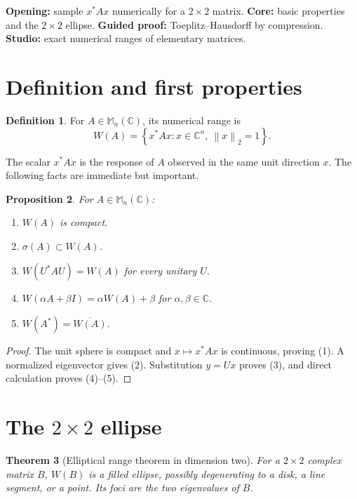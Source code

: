 \documentclass[11pt,oneside,openany]{book}
\newtheorem{theorem}{Theorem}[chapter]
\newtheorem{proposition}[theorem]{Proposition}
\theoremstyle{definition}
\newtheorem{definition}[theorem]{Definition}
\theoremstyle{remark}
\newcommand{\C}{\mathbb C}
\newcommand{\Mn}{\mathbb M_n(\C)}
\newcommand{\spec}{\sigma}
\newcommand{\norm}[1]{\left\lVert #1\right\rVert}
\newcommand{\set}[1]{\left\{#1\right\}}
\begin{document}
\begin{workshopplan}
\textbf{Opening:} sample \(x^*Ax\) numerically for a \(2\times2\)
matrix. \textbf{Core:} basic properties and the \(2\times2\) ellipse.
\textbf{Guided proof:} Toeplitz--Hausdorff by compression.
\textbf{Studio:} exact numerical ranges of elementary matrices.
\end{workshopplan}

\section{Definition and first properties}

\begin{definition}
For \(A\in\Mn\), its numerical range is
\[
  W(A)=\set{x^*Ax:x\in\C^n,\ \norm{x}_2=1}.
\]
\end{definition}

The scalar \(x^*Ax\) is the response of \(A\) observed in the same unit
direction \(x\).  The following facts are immediate but important.

\begin{proposition}
\label{prop:W-basic}
For \(A\in\Mn\):
\begin{enumerate}
  \item \(W(A)\) is compact.
  \item \(\spec(A)\subset W(A)\).
  \item \(W(U^*AU)=W(A)\) for every unitary \(U\).
  \item \(W(\alpha A+\beta I)=\alpha W(A)+\beta\) for
  \(\alpha,\beta\in\C\).
  \item \(W(A^*)=\overline{W(A)}\).
\end{enumerate}
\end{proposition}

\begin{proof}
The unit sphere is compact and \(x\mapsto x^*Ax\) is continuous,
proving (1).  A normalized eigenvector gives (2).  Substitution
\(y=Ux\) proves (3), and direct calculation proves (4)--(5).
\end{proof}

\section{The \texorpdfstring{\(2\times2\)}{2 by 2} ellipse}

\begin{theorem}[Elliptical range theorem in dimension two]
\label{thm:ellipse}
For a \(2\times2\) complex matrix \(B\), \(W(B)\) is a filled ellipse,
possibly degenerating to a disk, a line segment, or a point.  Its foci
are the two eigenvalues of \(B\).
\end{theorem}
\end{document}
